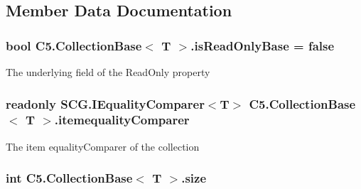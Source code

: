 \subsection{Member Data Documentation}
\hypertarget{class_c5_1_1_collection_base_ae603bb5742908edb4871693723d0deda}{}
\subsubsection[{is\+Read\+Only\+Base}]{\setlength{\rightskip}{0pt plus 5cm}bool {\bf C5.\+Collection\+Base}$<$ T $>$.is\+Read\+Only\+Base = false\hspace{0.3cm}{\ttfamily [protected]}}\label{class_c5_1_1_collection_base_ae603bb5742908edb4871693723d0deda}


The underlying field of the Read\+Only property 

\hypertarget{class_c5_1_1_collection_base_a95e343400be0e8f3f8d6310f1aaf2cc6}{}
\subsubsection[{itemequality\+Comparer}]{\setlength{\rightskip}{0pt plus 5cm}readonly S\+C\+G.\+I\+Equality\+Comparer$<$T$>$ {\bf C5.\+Collection\+Base}$<$ T $>$.itemequality\+Comparer\hspace{0.3cm}{\ttfamily [protected]}}\label{class_c5_1_1_collection_base_a95e343400be0e8f3f8d6310f1aaf2cc6}


The item equality\+Comparer of the collection 

\hypertarget{class_c5_1_1_collection_base_ab524b118754a5a8290b6528511272833}{}
\subsubsection[{size}]{\setlength{\rightskip}{0pt plus 5cm}int {\bf C5.\+Collection\+Base}$<$ T $>$.size\hspace{0.3cm}{\ttfamily [protected]}}\label{class_c5_1_1_collection_base_ab524b118754a5a8290b6528511272833}


